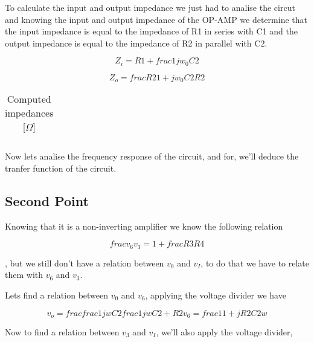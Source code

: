 \par To calculate the input and output impedance we just had to analise the circut and knowing the input and output impedance of the OP-AMP we determine that the input impedance is equal to the impedance of R1 in series with C1 and the output impedance is equal to the impedance of R2 in parallel with C2.

\begin{equation}
	Z_i = R1 + frac{1}{j w_0 C2}
\end{equation}

\begin{equation}
	Z_o = frac{R2}{1 + j w_0 C2 R2}
\end{equation}

\vspace{5mm}
\begin{table}[H]
	\centering
	\begin{tabularx}{0.9\textwidth} {
 	    | >{\raggedright\arraybackslash}X
  	    | >{\raggedleft\arraybackslash}X | }
	\hline
	
	\end{tabularx}
	\caption{Computed impedances [$\Omega$]}
	\label{tab:currents}
\end{table}
\vspace{5mm}

Now lets analise the frequency response of the circuit, and for, we'll deduce the tranfer function of the circuit.
 
\subsection{Second Point}

\par Knowing that it is a non-inverting amplifier we know the following relation

\begin{equation}
	frac{v_6}{v_3} = 1 + frac{R3}{R4}
\end{equation}

, but we still don't have a relation between $v_0$ and $v_I$, to do that we have to relate them with $v_6$ and $v_3$. 
\par Lets find a relation between $v_0$ and $v_6$, applying the voltage divider we have

\begin{equation}
	v_o = frac{frac{1}{jwC2}}{frac{1}{jwC2 + R2}}v_6 = frac{1}{1 + jR2C2w}
\end{equation}

\par Now to find a relation between $v_3$ and $v_I$, we'll also apply the voltage divider, 

